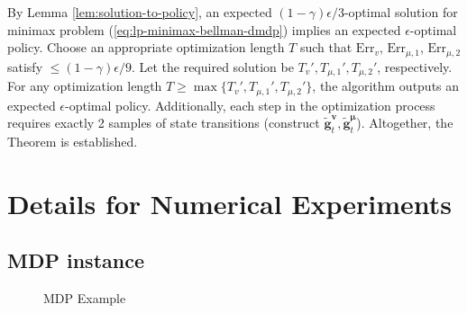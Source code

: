 \documentclass[12pt]{article}
\begin{document}
By Lemma \ref{lem:solution-to-policy}, an expected $(1-\gamma) \epsilon/3$-optimal solution for minimax problem (\ref{eq:lp-minimax-bellman-dmdp}) implies an expected $\epsilon$-optimal policy. Choose an appropriate optimization length $T$ such that $\text{Err}_{v}$, $\text{Err}_{\mu,1}$, $\text{Err}_{\mu,2}$ satisfy $\le (1-\gamma) \epsilon/9$. Let the required solution be $T_{v}',T_{\mu,1}',T_{\mu,2}'$, respectively. For any optimization length $T \ge \max \{T_{v}',T_{\mu,1}',T_{\mu,2}' \}$, the algorithm outputs an expected $\epsilon$-optimal policy. Additionally, each step in the optimization process requires exactly 2 samples of state transitions (construct $\tilde{\boldsymbol{g}}^{\boldsymbol{v}}_t, \tilde{\boldsymbol{g}}^{\boldsymbol{\mu}}_t$). Altogether, the Theorem is established.

\section{Details for Numerical Experiments}

\label{sec:app-details-numerical}
\subsection{MDP instance}

\begin{figure}[htb]
\centering
{}
\caption{MDP Example}
\label{fig:mdp-example}
\end{figure}
\end{document}

